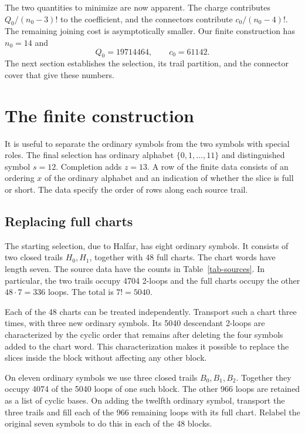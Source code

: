\documentclass[11pt]{article}
\begin{document}
The two quantities to minimize are now apparent. The charge contributes
$Q_0/(n_0-3)!$ to the coefficient, and the connectors contribute
$c_0/(n_0-4)!$. The remaining joining cost is asymptotically smaller.
Our finite construction has $n_0=14$ and
\begin{equation}\label{eq-base-numbers}
 Q_0=\num{19714464},\qquad c_0=\num{61142}.
\end{equation}
The next section establishes the selection, its trail partition, and
the connector cover that give these numbers.

\section{The finite construction}\label{sec-base}

It is useful to separate the ordinary symbols from the two symbols with
special roles. The final selection has ordinary alphabet
$\{0,1,\ldots,11\}$ and distinguished symbol $s=12$. Completion adds
$z=13$. A row of the finite data consists of an ordering $x$ of the
ordinary alphabet and an indication of whether the slice is full or short.
The data specify the order of rows along each source trail.

\subsection{Replacing full charts}

The starting selection, due to Halfar, has eight ordinary symbols.
It consists of two closed trails $H_0,H_1$, together with 48 full charts.
The chart words have length seven. The source data have the counts in
Table~\ref{tab-sources}. In particular, the two trails occupy 4704
2-loops and the full charts occupy the other $48\cdot7=336$ loops.
The total is $7!=5040$.

Each of the 48 charts can be treated independently. Transport such a
chart three times, with three new ordinary symbols. Its 5040 descendant
2-loops are characterized by the cyclic order that remains after deleting
the four symbols added to the chart word. This characterization makes it
possible to replace the slices inside the block without affecting any
other block.

On eleven ordinary symbols we use three closed trails $B_0,B_1,B_2$.
Together they occupy 4074 of the 5040 loops of one such block. The other
966 loops are retained as a list of cyclic bases. On adding the twelfth
ordinary symbol, transport the three trails and fill each of the 966
remaining loops with its full chart. Relabel the original seven symbols
to do this in each of the 48 blocks.
\end{document}

